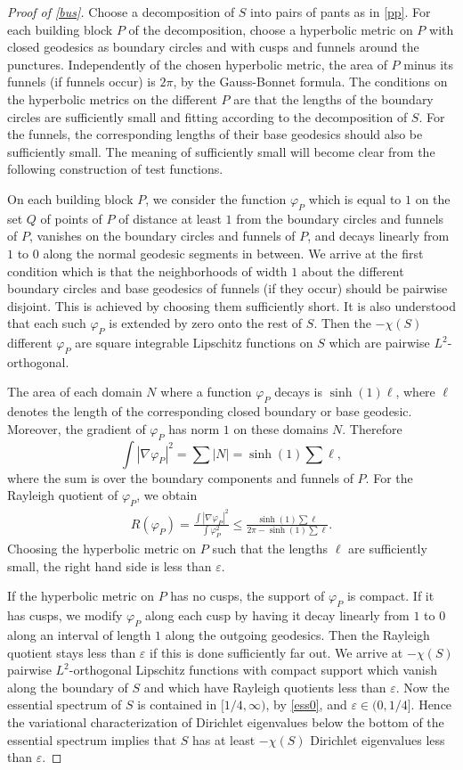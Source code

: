 \documentclass[a4paper,11pt]{amsart}
\numberwithin{equation}{section}
\theoremstyle{definition}
\def\ve{\varepsilon}
\def\vf{\varphi}
\begin{document}
\begin{proof}[Proof of \cref{bus}]
Choose a decomposition of $S$ into pairs of pants as in \cref{pp}.
For each building block $P$ of the decomposition, choose a hyperbolic metric on $P$ with closed geodesics as boundary circles
and with cusps and funnels around the punctures.
Independently of the chosen hyperbolic metric, the area of $P$ minus its funnels (if funnels occur) is $2\pi$, by the Gauss-Bonnet formula.
The conditions on the hyperbolic metrics on the different $P$ are that the lengths of the boundary circles are sufficiently small and fitting according to the decomposition of $S$.
For the funnels, the corresponding lengths of their base geodesics should also be sufficiently small.
The meaning of sufficiently small will become clear from the following construction of test functions.

On each building block $P$, we consider the function $\vf_P$ which is equal to $1$ on the set $Q$ of points of $P$ of distance at least $1$ from the boundary circles and funnels of $P$, vanishes on the boundary circles and funnels of $P$, and decays linearly from $1$ to $0$ along the normal geodesic segments in between.
We arrive at the first condition which is that the neighborhoods of width $1$ about the different boundary circles and base geodesics of funnels (if they occur) should be pairwise disjoint.
This is achieved by choosing them sufficiently short.
It is also understood that each such $\vf_P$ is extended by zero onto the rest of $S$.
Then the $-\chi(S)$ different $\vf_P$ are square integrable Lipschitz functions on $S$ which are pairwise $L^2$-orthogonal.

The area of each domain $N$ where a function $\vf_P$ decays is $\sinh(1)\ell$, where $\ell$ denotes the length of the corresponding closed boundary or base geodesic.
Moreover, the gradient of $\vf_P$ has norm $1$ on these domains $N$.
Therefore \[\int|\nabla\vf_P|^2=\sum|N|=\sinh(1)\sum\ell,\] where the sum is over the boundary components and funnels of $P$.
For the Rayleigh quotient of $\vf_P$, we obtain
\begin{align*}
  R(\vf_P) = \frac{\int|\nabla\vf_P|^2}{\int\vf_P^2} \le \frac{\sinh(1)\sum\ell}{2\pi-\sinh(1)\sum\ell}.
\end{align*}
Choosing the hyperbolic metric on $P$ such that the lengths $\ell$ are sufficiently small, the right hand side is less than $\ve$.

If the hyperbolic metric on $P$ has no cusps, the support of $\vf_P$ is compact.
If it has cusps, we modify $\vf_P$ along each cusp by having it decay linearly from $1$ to $0$ along an interval of length $1$ along the outgoing geodesics.
Then the Rayleigh quotient stays less than $\ve$ if this is done sufficiently far out.
We arrive at $-\chi(S)$ pairwise $L^2$-orthogonal Lipschitz functions with compact support which vanish along the boundary of $S$ and which have Rayleigh quotients less than $\ve$.
Now the essential spectrum of $S$ is contained in $[1/4,\infty)$, by \eqref{ess0}, and $\ve\in(0,1/4]$.
Hence the variational characterization of Dirichlet eigenvalues below the bottom of the essential spectrum implies that $S$ has at least $-\chi(S)$ Dirichlet eigenvalues less than $\ve$.
\end{proof}
\end{document}
